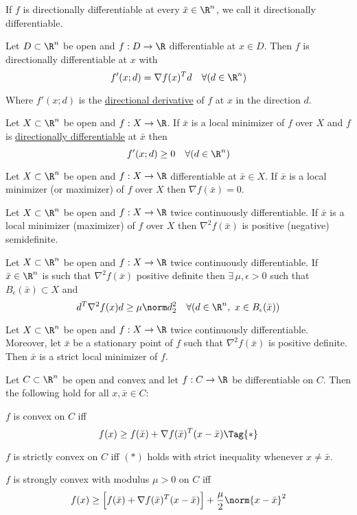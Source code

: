 If $f$ is directionally differentiable at every $\bar x\in\R^n$, we
call it directionally differentiable.

\label{ed67d29}

Let $D\subset \R^n$ be open and $f:D\to\R$
differentiable at $x\in D$. Then $f$ is directionally differentiable
at $x$ with
$$
	f'(x;d)=\nabla f(x)^Td\quad\forall(d\in\R^n)
$$

Where $f'(x;d)$ is the \href{37eb747}{directional derivative} of
$f$ at $x$ in the direction $d$.

\label{b3b5e10}

Let $X\subset\R^n$ be open and $f:X\to\R$. If $\bar x$ is a local
minimizer of $f$ over $X$ and $f$ is \href{37eb747}{directionally
	differentiable} at $\bar x$ then
$$
	f'(x;d)\geq 0\quad\forall(d\in\R^n)
$$

\label{dc165c9}

Let $X\subset\R^n$ be open and $f:X\to\R$ differentiable at $\bar x\in
	X$. If $\bar x$ is a local minimizer (or maximizer) of $f$ over $X$
then $\nabla f(\bar x)=0$.

\label{ce5370d}

Let $X\subset\R^n$ be open and $f:X\to\R$ twice continuously
differentiable. If $\bar x$ is a local minimizer (maximizer) of $f$
over $X$ then $\nabla^2f(\bar x)$ is positive (negative) semidefinite.

\label{eaa0d24}

Let $X\subset\R^n$ be open and $f:X\to\R$ twice continuously
differentiable. If $\bar x\in\R^n$ is such that $\nabla^2f(\bar x)$
positive definite then $\exists\,\mu,\epsilon>0$ such that
$B_\epsilon(\bar x)\subset X$ and
$$
	d^T\nabla^2f(x)d\geq\mu\norm d^2_2\quad\forall(d\in\R^n,\
	x\in B_\epsilon(\bar x))
$$

\label{b43d95d}

Let $X\subset\R^n$ be open and $f:X\to\R$ twice continuously
differentiable. Moreover, let $\bar x$ be a stationary point of $f$
such that $\nabla^2f(\bar x)$ is positive definite. Then $\bar x$ is a
strict local minimizer of $f$.

\label{cd9cea7}

Let $C\subset\R^n$ be open and convex and let $f:C\to\R$ be
differentiable on $C$. Then the following hold for all $x,\bar x\in
	C$:
\begin{enumerata}
	\item $f$ is convex on $C$ iff
	\begin{equation*}
		f(x)\geq f(\bar x)+\nabla f(\bar x)^T(x-\bar x)\Tag{*}
	\end{equation*}
	\item $f$ is strictly convex on $C$ iff $(*)$ holds with strict
	inequality whenever $x\neq\bar x$.
	\item $f$ is strongly convex with modulus $\mu>0$ on $C$ iff
	$$
		f(x)\geq\Big[f(\bar x)+\nabla f(\bar x)^T(x-\bar x)\Big]
		+\frac\mu2\norm{x-\bar x}^2
	$$
\end{enumerata}


